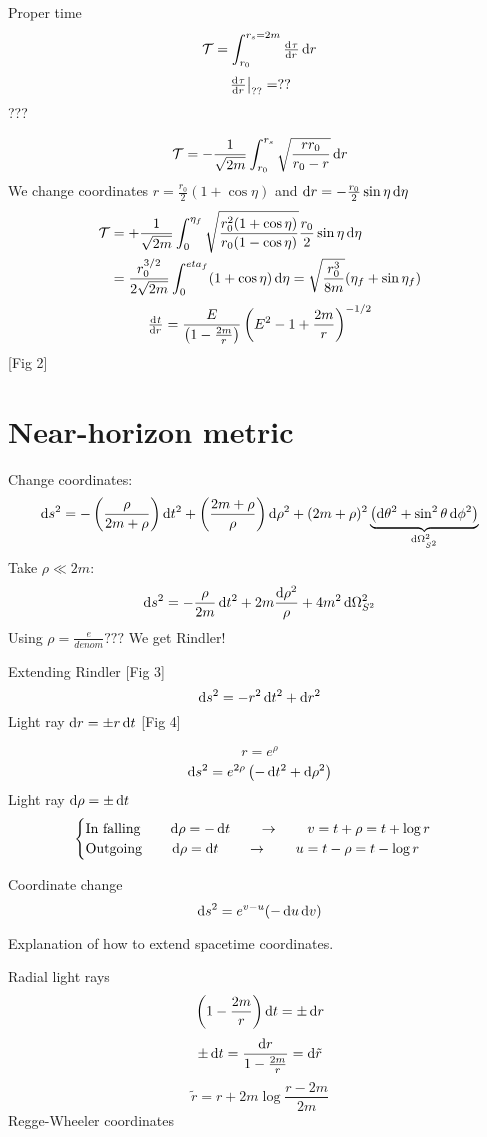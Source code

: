 Proper time
\[\mathcal{T} = \int_{r_0}^{r_s=2m}\od{\tau}{r}\diff{r}\]
\[ \left.\od{\tau}{r}\right|_{??} = ?? \]
???

\[\mathcal{T} = - \frac{1}{\sqrt{2m}}\int^{r_s}_{r_0} \sqrt{\frac{rr_0}{r_0-r}}\operatorname{d \!}{r}\]
We change coordinates $r = \frac{r_0}{2}(1+\cos\eta)$ and $\operatorname{d \!}{r} = - \frac{r_0}{2}\sin\eta \operatorname{d \!}{\eta}$
\begin{align*}
\mathcal{T} &= + \frac{1}{\sqrt{2m}}\int^{\eta_f}_0 \sqrt{\frac{r_0^2(1+\cos\eta)}{r_0(1-\cos\eta)}}\frac{r_0}{2}\sin\eta \operatorname{d \!}{\eta} \\
&= \frac{r_0^{3/2}}{2\sqrt{2m}}\int^{eta_f}_0 (1+\cos\eta)\operatorname{d \!}{\eta} = \sqrt{\frac{r^3_0}{8m}}(\eta_f + \sin\eta_f)
\end{align*}
\[ \od{t}{r} = \frac{E}{\left(1- \frac{2m}{r}\right)}\left(E^2-1+\frac{2m}{r}\right)^{-1/2} \]
[Fig 2]

\section{Near-horizon metric}
Change coordinates:
\[ \operatorname{d \!}{s}^2 = - \left(\frac{\rho}{2m+\rho}\right)\operatorname{d \!}{t}^2 + \left(\frac{2m+\rho}{\rho}\right)\operatorname{d \!}{\rho}^2 + (2m+\rho)^2 \underbrace{\left(\operatorname{d \!}{\theta}^2 + \sin^2\theta \operatorname{d \!}{\phi}^2\right)}_{\operatorname{d \!}{\Omega^2_{S^2}}} \]
Take $\rho \ll 2m$:
\[ \operatorname{d \!}{s}^2 = - \frac{\rho}{2m}\operatorname{d \!}{t}^2 + 2m \frac{\operatorname{d \!}{\rho}^2}{\rho} + 4m^2 \operatorname{d \!}{\Omega}^2_{S^2} \]
Using $\rho = \frac{e}{denom}???$
We get Rindler!

Extending Rindler
[Fig 3]
\[ \operatorname{d \!}{s}^2 = -r^2 \operatorname{d \!}{t}^2 + \operatorname{d \!}{r}^2 \]
Light ray $\operatorname{d \!}{r} = \pm r \operatorname{d \!}{t}$
[Fig 4]

\[r = e^\rho\]
\[ \operatorname{d \!}{s}^2 = e^{2\rho} \left(- \operatorname{d \!}{t}^2 + \operatorname{d \!}{\rho}^2\right) \]
Light ray $\operatorname{d \!}{\rho} = \pm \operatorname{d \!}{t}$
\[ \begin{cases}
\text{In falling} \qquad \operatorname{d \!}{\rho} = - \operatorname{d \!}{t} \qquad \to \qquad v = t+\rho = t+\log r \\
\text{Outgoing} \qquad \operatorname{d \!}{\rho} = \operatorname{d \!}{t} \qquad \to \qquad u = t-\rho = t-\log r \\
\end{cases} \]

Coordinate change
\[ \operatorname{d \!}{s}^2 = e^{v-u}(- \operatorname{d \!}{u}\operatorname{d \!}{v}) \]

Explanation of how to extend spacetime coordinates.

Radial light rays
\[ \left(1- \frac{2m}{r}\right)\operatorname{d \!}{t} = \pm \operatorname{d \!}{r} \]
\[ \pm \operatorname{d \!}{t} = \frac{\operatorname{d \!}{r}}{1- \frac{2m}{r}}= \operatorname{d \!}{\tilde{r}} \]
\[ \tilde{r} = r + 2m\log \frac{r-2m}{2m} \]
Regge-Wheeler coordinates

